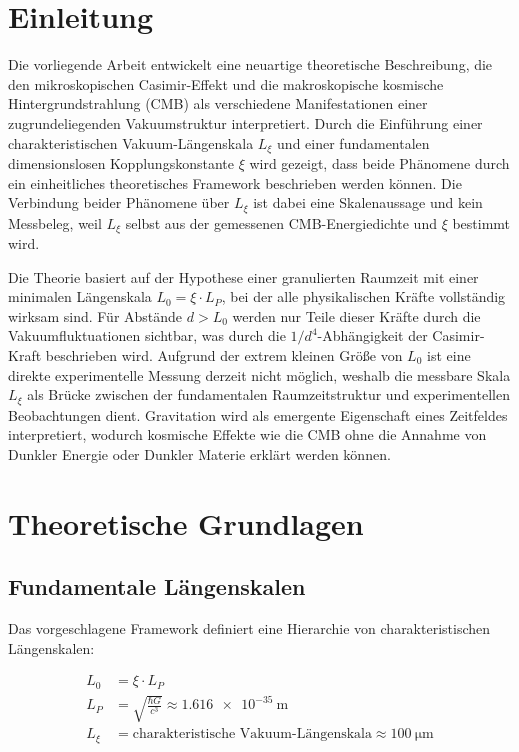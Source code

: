 	\section{Einleitung}
	
	Die vorliegende Arbeit entwickelt eine neuartige theoretische Beschreibung, die den mikroskopischen Casimir-Effekt und die makroskopische kosmische Hintergrundstrahlung (CMB) als verschiedene Manifestationen einer zugrundeliegenden Vakuumstruktur interpretiert. Durch die Einführung einer charakteristischen Vakuum-Längenskala \( L_\xi \) und einer fundamentalen dimensionslosen Kopplungskonstante \( \xi \) wird gezeigt, dass beide Phänomene durch ein einheitliches theoretisches Framework beschrieben werden können. Die Verbindung beider Phänomene über \( L_\xi \) ist dabei eine Skalenaussage und kein Messbeleg, weil \( L_\xi \) selbst aus der gemessenen CMB-Energiedichte und \( \xi \) bestimmt wird.
	
	Die Theorie basiert auf der Hypothese einer granulierten Raumzeit mit einer minimalen Längenskala \( L_0 = \xi \cdot L_P \), bei der alle physikalischen Kräfte vollständig wirksam sind. Für Abstände \( d > L_0 \) werden nur Teile dieser Kräfte durch die Vakuumfluktuationen sichtbar, was durch die \( 1/d^4 \)-Abhängigkeit der Casimir-Kraft beschrieben wird. Aufgrund der extrem kleinen Größe von \( L_0 \) ist eine direkte experimentelle Messung derzeit nicht möglich, weshalb die messbare Skala \( L_\xi \) als Brücke zwischen der fundamentalen Raumzeitstruktur und experimentellen Beobachtungen dient. Gravitation wird als emergente Eigenschaft eines Zeitfeldes interpretiert, wodurch kosmische Effekte wie die CMB ohne die Annahme von Dunkler Energie oder Dunkler Materie erklärt werden können.
	
	\section{Theoretische Grundlagen}
	
	\subsection{Fundamentale Längenskalen}
	
	Das vorgeschlagene Framework definiert eine Hierarchie von charakteristischen Längenskalen:
	
	\begin{align}
		L_0 &= \xi \cdot L_P \label{eq:L0_definition}\\
		L_P &= \sqrt{\frac{\hbar G}{c^3}} \approx \SI{1.616e-35}{\meter} \label{eq:planck_length}\\
		L_\xi &= \text{charakteristische Vakuum-Längenskala} \approx \SI{100}{\micro\meter} \label{eq:Lxi_definition}
	\end{align}
	
